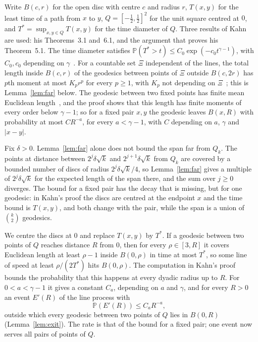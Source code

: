 \documentclass[11pt]{amsart}
\theoremstyle{remark}
\newcommand{\Prob}{\mathbb{P}}
\begin{document}
Write $B(c,r)$ for the open disc with centre $c$ and radius $r$, $T(x,y)$ for the least time of a path from $x$
to $y$, $Q=[-\tfrac12,\tfrac12]^2$ for the unit square centred at $0$, and $T^*=\sup_{x,y\in Q}T(x,y)$ for the time diameter of $Q$.
Three results of Kahn~\cite{Kahn} are used: his Theorems~3.1 and~6.1, and the argument that proves his
Theorem~5.1. The time diameter satisfies
$\Prob(T^*>t)\le C_0\exp(-c_0t^{\gamma-1})$, with $C_0,c_0$ depending on $\gamma$~\cite[Theorem~3.1]{Kahn}. For a countable set $\Xi$ independent of the
lines, the total length inside $B(c,r)$ of the geodesics between points of $\Xi$ outside $B(c,2r)$ has $p$th moment at
most $K_pr^p$ for every $p\ge1$, with $K_p$ not depending on $\Xi$~\cite[Theorem~6.1 and its proof]{Kahn}; this is
Lemma~\ref{lem:far} below. The geodesic between two fixed points has finite mean Euclidean
length~\cite[Theorem~5.1]{Kahn}, and the proof shows that this length has finite moments of every order below
$\gamma-1$; so for a fixed pair $x,y$ the geodesic leaves $B(x,R)$ with probability at most $CR^{-a}$, for every
$a<\gamma-1$, with $C$ depending on $a$, $\gamma$ and $|x-y|$.

Fix $\delta>0$. Lemma~\ref{lem:far} alone does not bound the span far from $Q_k$. The points at distance between $2^j\delta\sqrt k$ and
$2^{j+1}\delta\sqrt k$ from $Q_k$ are covered by a bounded number of discs of radius $2^j\delta\sqrt k/4$, so
Lemma~\ref{lem:far} gives a multiple of $2^j\delta\sqrt k$ for the expected length of the span there, and the sum over $j\ge0$
diverges. The bound for a fixed pair has the decay that is missing, but for one geodesic: in Kahn's proof the discs are
centred at the endpoint $x$ and the time bound is $T(x,y)$, and both change with the pair, while the span is a union
of $\binom k2$ geodesics.

We centre the discs at $0$ and replace $T(x,y)$ by $T^*$. If a geodesic between two points of $Q$ reaches distance $R$
from $0$, then for every $\rho\in[3,R]$ it covers Euclidean length at least $\rho-1$ inside $B(0,\rho)$ in time at most
$T^*$, so some line of speed at least $\rho/(2T^*)$ hits $B(0,\rho)$. The computation in Kahn's proof bounds the
probability that this happens at every dyadic radius up to $R$. For $0<a<\gamma-1$ it gives a constant $C_a$,
depending on $a$ and $\gamma$, and for every $R>0$ an event $E'(R)$ of the line process with
\begin{equation}\label{eq:exit-intro}
\Prob(E'(R))\le C_aR^{-a},
\end{equation}
outside which every geodesic between two points of $Q$ lies in $B(0,R)$ (Lemma~\ref{lem:exit}). The rate is that of the bound for a fixed pair; one event
now serves all pairs of points of $Q$.
\end{document}
